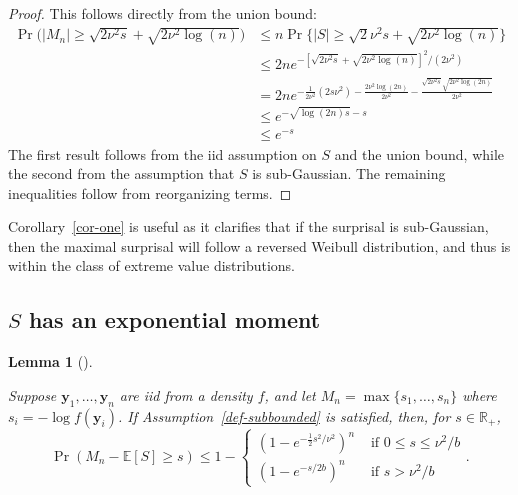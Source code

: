 \documentclass[
  12pt]{article}
\newcommand{\E}{\mathbb{E}}
\theoremstyle{definition}
\theoremstyle{plain}
\theoremstyle{plain}
\theoremstyle{plain}
\newtheorem{lemma}{Lemma}[section]
\theoremstyle{remark}
\begin{document}
\begin{proof}
This follows directly from the union bound: \begin{align}
\Pr\Big(|M_n|\ge \sqrt{2\nu^2s} + \sqrt{2\nu^2\log(n)}\Big)
 & \le n \Pr\Big\{|S|\ge \sqrt{2}\nu^2s + \sqrt{2\nu^2\log(n)}\Big\} \\
 & \le 2n e^{-[\sqrt{2\nu^2s}+\sqrt{2\nu^2\log(n)}]^2/(2\nu^2)} \\
 & = 2n e^{-\frac{1}{2\nu^2}(2s\nu^2 )-\frac{2\nu^2\log(2n)}{2\nu^2}-\frac{\sqrt{2\nu^2s}\sqrt{2\nu^2\log(2n)}}{2\nu^2}} \\
 & \le e^{-\sqrt{\log(2n)s}-s} \\
 & \le e^{-s}
\end{align} The first result follows from the iid assumption on \(S\)
and the union bound, while the second from the assumption that \(S\) is
sub-Gaussian. The remaining inequalities follow from reorganizing terms.
\end{proof}

Corollary~\ref{cor-one} is useful as it clarifies that if the surprisal
is sub-Gaussian, then the maximal surprisal will follow a reversed
Weibull distribution, and thus is within the class of extreme value
distributions.

\subsection{\texorpdfstring{\(S\) has an exponential
moment}{S has an exponential moment}}\label{s-has-an-exponential-moment}

\begin{lemma}[]\protect\hypertarget{lem-bounds_sub}{}\label{lem-bounds_sub}

Suppose \(\bm{y}_1,\dots,\bm{y}_n\) are iid from a density \(f\), and
let \(M_n = \max\{s_1,\dots,s_n\}\) where \(s_i = -\log f(\bm{y}_i)\).
If Assumption~\ref{def-subbounded} is satisfied, then, for
\(s\in\mathbb{R}_+\), \[
    \Pr\left(M_n-\E[S]\ge s\right)\le 1-
    \begin{cases}
        (1-e^{-\frac{1}{2}s^2/\nu^2})^n & \text{ if }0\le s\le \nu^2/b \\
        (1-e^{-s/2b})^n                 & \text{ if }s>\nu^2/b
    \end{cases}.
\]

\end{lemma}
\end{document}
